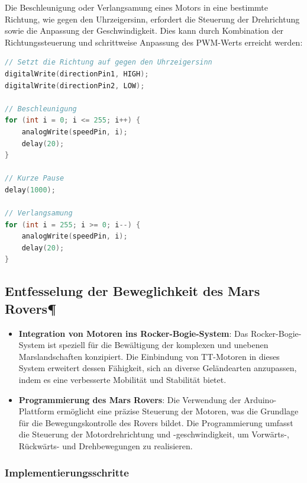 \documentclass{vorlage-design-main}
\begin{document}
Die Beschleunigung oder Verlangsamung eines Motors in eine bestimmte
Richtung, wie gegen den Uhrzeigersinn, erfordert die Steuerung der
Drehrichtung sowie die Anpassung der Geschwindigkeit. Dies kann durch
Kombination der Richtungssteuerung und schrittweise Anpassung des
PWM-Werts erreicht werden:

\begin{lstlisting}[language={C++}]
// Setzt die Richtung auf gegen den Uhrzeigersinn
digitalWrite(directionPin1, HIGH);
digitalWrite(directionPin2, LOW);

// Beschleunigung
for (int i = 0; i <= 255; i++) {
    analogWrite(speedPin, i);
    delay(20);
}

// Kurze Pause
delay(1000);

// Verlangsamung
for (int i = 255; i >= 0; i--) {
    analogWrite(speedPin, i);
    delay(20);
}
\end{lstlisting}

\hypertarget{entfesselung-der-beweglichkeit-des-mars-rovers}{%
\subsection{Entfesselung der Beweglichkeit des Mars
Rovers¶}\label{entfesselung-der-beweglichkeit-des-mars-rovers}}

\begin{itemize}

\item
  \textbf{Integration von Motoren ins Rocker-Bogie-System}: Das
  Rocker-Bogie-System ist speziell für die Bewältigung der komplexen und
  unebenen Marslandschaften konzipiert. Die Einbindung von TT-Motoren in
  dieses System erweitert dessen Fähigkeit, sich an diverse Geländearten
  anzupassen, indem es eine verbesserte Mobilität und Stabilität bietet.
\item
  \textbf{Programmierung des Mars Rovers}: Die Verwendung der
  Arduino-Plattform ermöglicht eine präzise Steuerung der Motoren, was
  die Grundlage für die Bewegungskontrolle des Rovers bildet. Die
  Programmierung umfasst die Steuerung der Motordrehrichtung und
  -geschwindigkeit, um Vorwärts-, Rückwärts- und Drehbewegungen zu
  realisieren.
\end{itemize}

\hypertarget{implementierungsschritte}{%
\subsubsection{Implementierungsschritte}\label{implementierungsschritte}}
\end{document}
